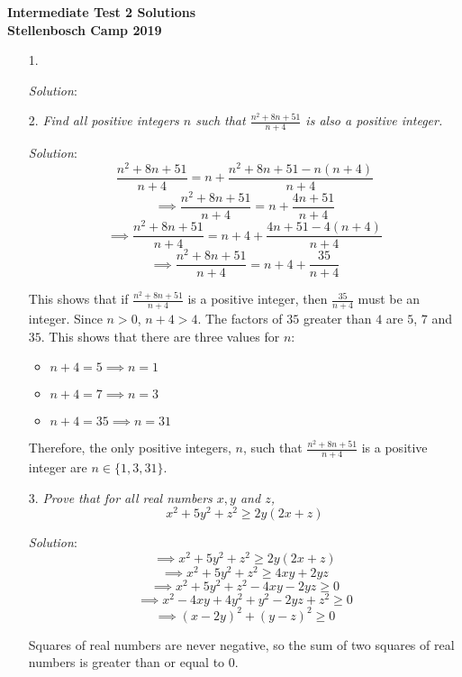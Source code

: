 \documentclass{article}
\begin{document}
\begin{center}
  \textbf{\Large Intermediate Test 2 Solutions}
  \\ \vspace{1em}
  \textbf{\large Stellenbosch Camp 2019}
\end{center}


\begin{enumerate}[1.]

\item[1.] %
\textit{}

\textit{Solution}:


\item[2.] %
\textit{Find all positive integers $n$ such that $\frac{n^2 + 8n + 51}{n + 4}$ is also a positive integer.}

\textit{Solution}:
$$\frac{n^2 + 8n + 51}{n + 4} = n + \frac{n^2 + 8n + 51 - n(n + 4)}{n + 4}$$
$$\implies \frac{n^2 + 8n + 51}{n + 4} = n + \frac{4n + 51}{n + 4}$$
$$\implies \frac{n^2 + 8n + 51}{n + 4} = n + 4 + \frac{4n + 51 - 4(n + 4)}{n + 4}$$
$$\implies \frac{n^2 + 8n + 51}{n + 4} = n + 4 + \frac{35}{n + 4}$$

This shows that if $\frac{n^2 + 8n + 51}{n + 4}$ is a positive integer, then $\frac{35}{n + 4}$ must be an integer. Since $n > 0$, $n + 4 > 4$.
The factors of $35$ greater than $4$ are $5$, $7$ and $35$. This shows that there are three values for $n$:
\begin{itemize}
    \item $n + 4 = 5 \implies n = 1$
    \item $n + 4 = 7 \implies n = 3$
    \item $n + 4 = 35 \implies n = 31$
\end{itemize}

Therefore, the only positive integers, $n$, such that $\frac{n^2 + 8n + 51}{n + 4}$ is a positive integer are $n \in \{1, 3, 31\}.$


\item[3.] %
\textit{Prove that for all real numbers $x, y$ and $z$,
$$x^2 + 5y^2 + z^2 \ge 2y(2x + z)$$}

\textit{Solution}:
$$\implies x^2 + 5y^2 + z^2 \ge 2y(2x + z)$$
$$\implies x^2 + 5y^2 + z^2 \ge 4xy + 2yz$$
$$\implies x^2 + 5y^2 + z^2 - 4xy - 2yz \ge 0$$
$$\implies x^2 - 4xy + 4y^2 + y^2 - 2yz + z^2 \ge 0$$
$$\implies (x - 2y)^2 + (y - z)^2 \ge 0$$

Squares of real numbers are never negative, so the sum of two squares of real numbers is greater than or equal to 0.




\end{enumerate}
\end{document}
